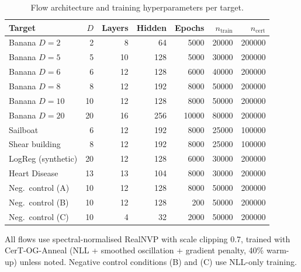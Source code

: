 \documentclass[12pt]{article}
\begin{document}
\begin{table}[h]
\centering
\caption{Flow architecture and training hyperparameters per target.}
\label{tab:hyperparams}
\begin{tabular}{lrrrrrr}
\toprule
Target & $D$ & Layers & Hidden & Epochs & $n_{\mathrm{train}}$ & $n_{\mathrm{cert}}$ \\
\midrule
Banana $D=2$ & 2 & 8 & 64 & 5000 & 20000 & 200000 \\
Banana $D=5$ & 5 & 10 & 128 & 5000 & 30000 & 200000 \\
Banana $D=6$ & 6 & 12 & 128 & 6000 & 40000 & 200000 \\
Banana $D=8$ & 8 & 12 & 192 & 8000 & 50000 & 200000 \\
Banana $D=10$ & 10 & 12 & 128 & 8000 & 50000 & 200000 \\
Banana $D=20$ & 20 & 16 & 256 & 10000 & 80000 & 200000 \\
Sailboat & 6 & 12 & 192 & 8000 & 25000 & 100000 \\
Shear building & 8 & 12 & 192 & 8000 & 25000 & 100000 \\
LogReg (synthetic) & 20 & 12 & 128 & 6000 & 30000 & 200000 \\
Heart Disease & 13 & 13 & 104 & 8000 & 30000 & 200000 \\
Neg.\ control (A) & 10 & 12 & 128 & 8000 & 50000 & 200000 \\
Neg.\ control (B) & 10 & 12 & 128 & 200 & 50000 & 200000 \\
Neg.\ control (C) & 10 & 4 & 32 & 2000 & 50000 & 200000 \\
\bottomrule
\end{tabular}

\smallskip
\begin{minipage}{\linewidth}
\small All flows use spectral-normalised RealNVP with scale clipping 0.7, trained with CerT-OG-Anneal (NLL + smoothed oscillation + gradient penalty, 40\% warm-up) unless noted. Negative control conditions (B) and (C) use NLL-only training.
\end{minipage}
\end{table}
\end{document}
